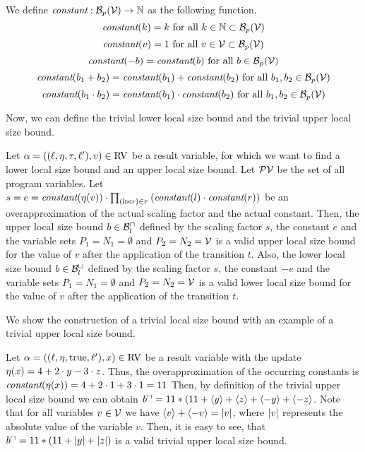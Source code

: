 \begin{definition}
  We define $\emph{constant}: \mathcal{B}_p(\mathcal{V}) \rightarrow \mathbb{N}$ as the following function.
  \[ \emph{constant}(k) = k \text{ for all } k \in \mathbb{N} \subset \mathcal{B}_p(\mathcal{V}) \] 
  \[ \emph{constant}(v) = 1 \text{ for all } v \in \mathcal{V} \subset \mathcal{B}_p(\mathcal{V}) \] 
  \[ \emph{constant}(-b) = \emph{constant}(b) \text{ for all } b \in \mathcal{B}_p(\mathcal{V}) \] 
  \[ \emph{constant}(b_1 + b_2) = \emph{constant}(b_1) + \emph{constant}(b_2) \text{ for all } b_1, b_2 \in \mathcal{B}_p(\mathcal{V}) \] 
  \[ \emph{constant}(b_1 \cdot b_2) = \emph{constant}(b_1) \cdot \emph{constant}(b_2) \text{ for all } b_1, b_2 \in \mathcal{B}_p(\mathcal{V}) \] 
\end{definition}

Now, we can define the trivial lower local size bound and the trivial upper local size bound.

\begin{definition}
  Let $\alpha = ((\ell,\eta,\tau,\ell'),v) \in \text{RV}$ be a result variable, for which we want to find a lower local size bound and an upper local size bound.
  Let $\mathcal{PV}$ be the set of all program variables.
  Let $s = e = \emph{constant}(\eta(v)) \cdot \prod_{(l \bowtie r) \in \tau} \left( \emph{constant}(l) \cdot \emph{constant}(r) \right)$ be an overapproximation of the actual scaling factor and the actual constant.
  Then, the upper local size bound $b \in \mathcal{B}^\sqcap_l$ defined by the scaling factor $s$, the constant $e$ and the variable sets $P_1 = N_1 = \emptyset$ and $P_2 = N_2 = \mathcal{V}$ is a valid upper local size bound for the value of $v$ after the application of the transition $t$.
  Also, the lower local size bound $b \in \mathcal{B}^\sqcup_l$ defined by the scaling factor $s$, the constant $-e$ and the variable sets $P_1 = N_1 = \emptyset$ and $P_2 = N_2 = \mathcal{V}$ is a valid lower local size bound for the value of $v$ after the application of the transition $t$.
\end{definition}



We show the construction of a trivial local size bound with an example of a trivial upper local size bound.

\begin{example}
  Let $\alpha = ((\ell,\eta,\text{true},\ell'),x) \in \text{RV}$ be a result variable with the update $\eta(x) = 4 + 2 \cdot y - 3 \cdot z$.
  Thus, the overapproximation of the occurring constants is $\emph{constant}(\eta(x)) = 4 + 2 \cdot 1 + 3 \cdot 1 = 11$
  Then, by definition of the trivial upper local size bound we can obtain $b^\sqcap = 11 * (11 + \langle y\rangle + \langle z\rangle + \langle-y\rangle + \langle-z\rangle$.
  Note that for all variables $v \in \mathcal{V}$ we have $\langle v\rangle + \langle-v\rangle = \left|v\right|$, where $\left|v\right|$ represents the absolute value of the variable $v$.
  Then, it is easy to see, that $b^\sqcap = 11 * (11 + \left|y\right| + \left|z\right|)$ is a valid trivial upper local size bound.
\end{example}

